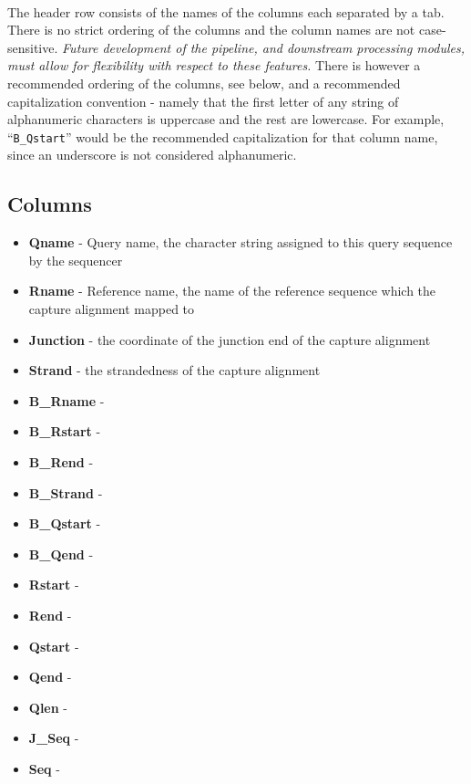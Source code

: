 \documentclass{article}
\begin{document}
\paragraph{} The header row consists of the names of the columns each separated by a tab. There is no strict ordering of the columns and the column names are not case-sensitive. \emph {Future development of the pipeline, and downstream processing modules, must allow for flexibility with respect to these features.} There is however a recommended ordering of the columns, see below, and a recommended capitalization convention - namely that the first letter of any string of alphanumeric characters is uppercase and the rest are lowercase. For example, ``\texttt{B\_Qstart}'' would be the recommended capitalization for that column name, since an underscore is not considered alphanumeric.


\subsection{Columns}
\begin{itemize}
  \item \textbf{Qname} - Query name, the character string assigned to this query sequence by the sequencer
  \item \textbf{Rname} - Reference name, the name of the reference sequence which the capture alignment mapped to
  \item \textbf{Junction} - the coordinate of the junction end of the capture alignment
  \item \textbf{Strand} - the strandedness of the capture alignment 
  \item \textbf{B\_Rname} - 
  \item \textbf{B\_Rstart} - 
  \item \textbf{B\_Rend} - 
  \item \textbf{B\_Strand} - 
  \item \textbf{B\_Qstart} - 
  \item \textbf{B\_Qend} - 
  \item \textbf{Rstart} - 
  \item \textbf{Rend} - 
  \item \textbf{Qstart} - 
  \item \textbf{Qend} - 
  \item \textbf{Qlen} - 
  \item \textbf{J\_Seq} - 
  \item \textbf{Seq} - 
\end{itemize}
\end{document}
